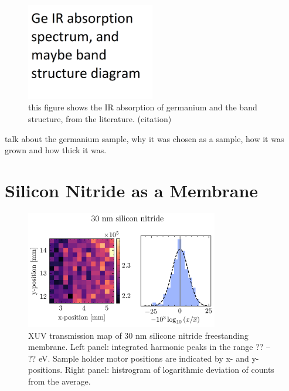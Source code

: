 \begin{figure}
	\centering
	\includegraphics[width=0.5\textwidth]{figures/chap3/Ge_IR_absorption.png}
	\caption{this figure shows the IR absorption of germanium and the band structure, from the literature. (citation)}
	\label{fig:Ge_IR_absorption}
\end{figure}


talk about the germanium sample, why it was chosen as a sample, how it was grown and how thick it was.

\section{Silicon Nitride as a Membrane}

\begin{figure}
	\centering
	\includegraphics[width=0.75\textwidth]{figures/chap3/nitride_map.png}
	\caption{XUV transmission map of 30 nm silicone nitride freestanding membrane. Left panel: integrated harmonic peaks in the range ?? -- ?? eV. Sample holder motor positions are indicated by x- and y-positions. Right panel: histrogram of logarithmic deviation of counts from the average.}
	\label{fig:nitride_map}
\end{figure}

